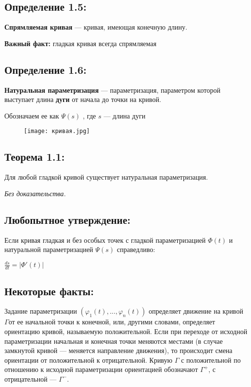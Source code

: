 \documentclass[12pt, english]{article}
\begin{document}
\subsection*{Определение 1.5:}
\begin{flushleft}
\textbf{Спрямляемая кривая} — кривая, имеющая конечную длину.

\textbf{Важный факт:} гладкая кривая всегда спрямляемая

\end{flushleft}
\subsection*{Определение 1.6:}
\begin{flushleft}
\textbf{Натуральная параметризация} — параметризация, параметром которой выступает длина \textbf{дуги} от начала до точки на кривой.

Обозначаем ее как $\Psi(s)$ , где $s$ — длина дуги
\end{flushleft}
\begin{figure}[h]
\centering
\texttt{[image: кривая.jpg]}
\end{figure}

\subsection*{Теорема 1.1:}
	Для любой гладкой кривой существует натуральная параметризация.
	
	\textit{Без доказательства.}
	
\subsection*{Любопытное утверждение:}
Если кривая гладкая и без особых точек с гладкой параметризацией 
$\Phi(t)$ и натуральной параметризацией $\Psi(s)$ справедливо:
\begin{center}
$\frac{ds}{dt} = |\Phi'(t)|$
\end{center}
\newpage
\subsection*{Некоторые факты:}
Задание параметризации $(\varphi_1(t), ... , \varphi_n(t))$ определяет движение на кривой $\Gamma $от ее начальной точки к конечной, или, другими словами, определяет ориентацию кривой, называемую положительной. Если при переходе от исходной параметризации начальная и конечная точки меняются местами (в случае замкнутой кривой — меняется направление движения), то происходит смена ориентации от положительной к отрицательной. Кривую $\Gamma$ с положительной по отношению к исходной параметризации ориентацией обозначают $\Gamma^+$, с отрицательной — $\Gamma^-$.
\end{document}
